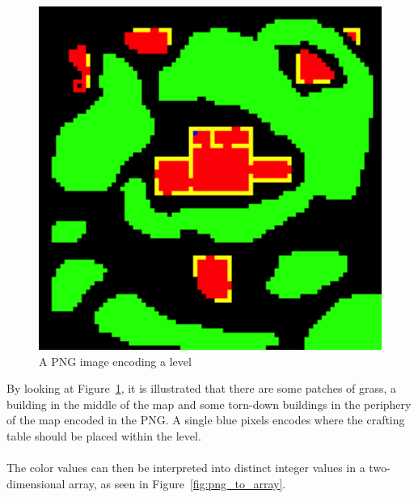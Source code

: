 \begin{figure}[H]
    \centering
    \includegraphics[width=1\textwidth]{figures/generating_levels/map.png}
    \caption{A PNG image encoding a level}
    \label{fig:png_map}
\end{figure}
By looking at Figure~\ref{fig:png_map}, it is illustrated that there are some patches of grass, a building in the middle of the map and some torn-down buildings in the periphery of the map encoded in the PNG.
A single blue pixels encodes where the crafting table should be placed within the level.
\\\\
The color values can then be interpreted into distinct integer values in a two-dimensional array, as seen in Figure~\ref{fig:png_to_array}.
